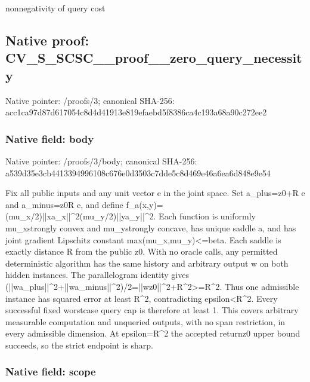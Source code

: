 \documentclass[10pt,a4paper]{article}
\begin{document}
nonnegativity of query cost


\subsection{Native proof: CV\_S\_SCSC\_\_proof\_\_zero\_query\_necessity}


Native pointer: /proofs/3; canonical SHA-256: acc1ca97d87d617054c8d4d4\allowbreak{}1913e819efaebd5f8386ca4c\allowbreak{}193a68a90c272ee2



\subsubsection{Native field: body}


Native pointer: /proofs/3/body; canonical SHA-256: a539d35e3cb4413394996108\allowbreak{}c676e0d3503c7dde5c8d469e\allowbreak{}46a6ea6d848e9e54


Fix all public inputs and any unit vector e in the joint space. Set a\_plus=z0+R e and a\_minus=z0R e, and define f\_a(x,y)=(mu\_x/2)||xa\_x\allowbreak{}||\textasciicircum{}2(mu\_y/2)||ya\_y||\textasciicircum{}2\allowbreak{}. Each function is uniformly mu\_xstrongly convex and mu\_ystrongly concave, has unique saddle a, and has joint gradient Lipschitz constant max(mu\_x,mu\_y)<=beta. Each saddle is exactly distance R from the public z0. With no oracle calls, any permitted deterministic algorithm has the same history and arbitrary output w on both hidden instances. The parallelogram identity gives (||wa\_plus||\textasciicircum{}2+||wa\_mi\allowbreak{}nus||\textasciicircum{}2)/2=||wz0||\textasciicircum{}2+R\textasciicircum{}\allowbreak{}2>=R\textasciicircum{}2. Thus one admissible instance has squared error at least R\textasciicircum{}2, contradicting epsilon<R\textasciicircum{}2. Every successful fixed worstcase query cap is therefore at least 1. This covers arbitrary measurable computation and unqueried outputs, with no span restriction, in every admissible dimension. At epsilon=R\textasciicircum{}2 the accepted returnz0 upper bound succeeds, so the strict endpoint is sharp.


\subsubsection{Native field: scope}
\end{document}
